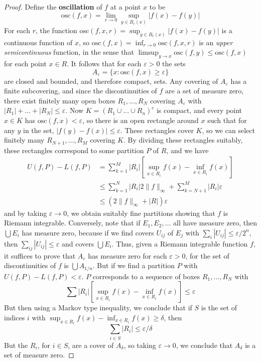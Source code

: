 \begin{proof}
  Define the {\bf oscillation} of $f$ at a point $x$ to be
  \[ \text{osc}(f,x) = \lim_{r \to 0} \sup_{y \in B_r(x)} |f(x) - f(y)| \]
  For each $r$, the function $\text{osc}(f,x,r) = \sup_{y \in B_r(x)} |f(x) - f(y)|$ is a continuous function of $x$, so $\text{osc}(f,x) = \inf_{r \to 0} \text{osc}(f,x,r)$ is an {\it upper semicontinuous} function, in the sense that $\limsup_{y \to x} \text{osc}(f,y) \leq \text{osc}(f,x)$ for each point $x \in R$. It follows that for each $\varepsilon > 0$ the sets
  \[ A_\varepsilon = \{ x: \text{osc}(f,x) \geq \varepsilon \} \]
  are closed and bounded, and therefore compact, sets. Any covering of $A_\varepsilon$ has a finite subcovering, and since the discontinuities of $f$ are a set of measure zero, there exist finitely many open boxes $R_1, \dots, R_N$ covering $A_\varepsilon$ with $|R_1| + \dots + |R_N| \leq \varepsilon$. Now $K = (R_1 \cup \dots \cup R_n)^c$ is compact, and every point $x \in K$ has $\text{osc}(f,x) < \varepsilon$, so there is an open rectangle around $x$ such that for any $y$ in the set, $|f(y) - f(x)| \leq \varepsilon$. These rectangles cover $K$, so we can select finitely many $R_{N+1}, \dots, R_M$ covering $K$. By dividing these rectangles suitably, these rectangles correspond to some partition $P$ of $R$, and we have
  \begin{align*}
    U(f,P) - L(f,P) &= \sum_{k = 1}^M |R_i| \left[ \sup_{x \in R_i} f(x) - \inf_{x \in R_i} f(x) \right]\\
    &\leq \sum_{k = 1}^N |R_i| 2 \| f \|_\infty + \sum_{k = N+1}^M |R_i| \varepsilon\\
    &\leq (2 \| f \|_\infty + |R|) \varepsilon
  \end{align*}
  and by taking $\varepsilon \to 0$, we obtain suitably fine partitions showing that $f$ is Riemann integrable. Conversely, note that if $E_1, E_2, \dots$ all have measure zero, then $\bigcup E_i$ has measure zero, because if we find covers $U_{ij}$ of $E_j$ with $\sum_i |U_{ij}| \leq \varepsilon/2^n$, then $\sum_{ij} |U_{ij}| \leq \varepsilon$ and covers $\bigcup E_i$. Thus, given a Riemann integrable function $f$, it suffices to prove that $A_\varepsilon$ has measure zero for each $\varepsilon > 0$, for the set of discontinuities of $f$ is $\bigcup A_{1/n}$. But if we find a partition $P$ with $U(f,P) - L(f,P) < \varepsilon$. $P$ corresponds to a sequence of boxes $R_1, \dots, R_N$ with
  \[ \sum |R_i| \left[ \sup_{x \in R_i} f(x) - \inf_{x \in R_i} f(x) \right] \leq \varepsilon \]
  But then using a Markov type inequality, we conclude that if $S$ is the set of indices $i$ with $\sup_{x \in R_i} f(x) - \inf_{x \in R_i} f(x) \geq \delta$, then
  \[ \sum_{i \in S} |R_i| \leq \varepsilon / \delta \]
  But the $R_i$, for $i \in S$, are a cover of $A_\delta$, so taking $\varepsilon \to 0$, we conclude that $A_\delta$ is a set of measure zero.
\end{proof}

